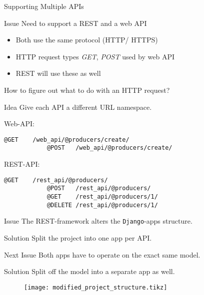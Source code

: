 \documentclass{beamer}
\newcommand{\django}{\texttt{Django}}
\begin{document}
    \begin{frame}{Supporting Multiple APIs}
        \begin{alertblock}{Issue}
            Need to support a REST and a web API
        \end{alertblock}

        \begin{itemize}
            \item Both use the same protocol (HTTP/ HTTPS)
            \item HTTP request types \emph{GET}, \emph{POST} used by web API
            \item REST will use these as well
        \end{itemize}
    
        How to figure out what to do with an HTTP request?
     
        \framebreak
    
        \begin{block}{Idea} 
            Give each API a different URL namespace.
        \end{block}
    
        Web-API:
        \begin{lstlisting}[style=http]
            @GET    /web_api/@producers/create/
            @POST   /web_api/@producers/create/
        \end{lstlisting}
    
        REST-API:
        \begin{lstlisting}[style=http]
            @GET    /rest_api/@producers/
            @POST   /rest_api/@producers/
            @GET    /rest_api/@producers/1/
            @DELETE /rest_api/@producers/1/
        \end{lstlisting}
    
        \framebreak
    
        \begin{alertblock}{Issue}
            The REST-framework alters the \django{}-apps structure.
        \end{alertblock}
        
        \begin{exampleblock}{Solution}
            Split the project into one app per API.
        \end{exampleblock}

        \begin{alertblock}{Next Issue}
            Both apps have to operate on the exact same model.
        \end{alertblock}
        
        \begin{exampleblock}{Solution}
            Split off the model into a separate app as well.
        \end{exampleblock}
    
    \framebreak
    
        \begin{figure}
            \centering
            \texttt{[image: modified\_project\_structure.tikz]}
        \end{figure}
    
    \end{frame}
\end{document}
